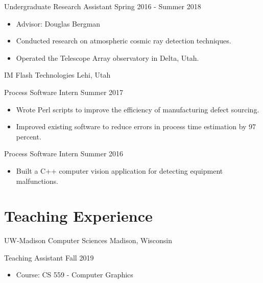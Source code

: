 \begin{tab2} Undergraduate Research Assistant \> Spring 2016 - Summer 2018 \end{tab2}
\begin{itemize}
    \item Advisor: Douglas Bergman
    \item Conducted research on atmospheric cosmic ray detection techniques.
    \item Operated the Telescope Array observatory in Delta, Utah.
\end{itemize}

\blockskip

\begin{tab1} IM Flash Technologies \> Lehi, Utah \end{tab1}

\begin{tab2} Process Software Intern \> Summer 2017 \end{tab2}
\begin{itemize}
    \item Wrote Perl scripts to improve the efficiency of manufacturing defect sourcing.
    \item Improved existing software to reduce errors in process time estimation by 97 percent.
\end{itemize}

\begin{tab2} Process Software Intern \> Summer 2016 \end{tab2}
\begin{itemize}
    \item Built a C++ computer vision application for detecting equipment malfunctions.
\end{itemize}


\section*{Teaching Experience}

\begin{tab1} UW-Madison Computer Sciences \> Madison, Wisconsin \end{tab1}

\begin{tab2} Teaching Assistant \> Fall 2019 \end{tab2}
\begin{itemize}
    \item Course: CS 559 - Computer Graphics
\end{itemize}

